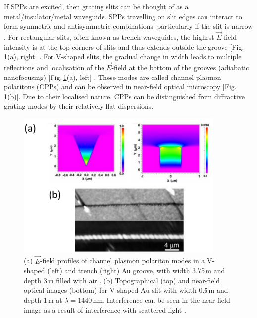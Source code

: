 If SPPs are excited, then grating slits can be thought of as a metal/insulator/metal waveguide. SPPs travelling on slit edges can interact to form symmetric and antisymmetric combinations, particularly if the slit is narrow \cite{Maier2007}. For rectangular slits, often known as trench waveguides, the highest $\vec{E}$-field intensity is at the top corners of slits and thus extends outside the groove [Fig.\,\ref{3Fig6}(a), right] \cite{Bozhevolnyi2005, Srivastava2009, Chattopadhyay2012}. For V-shaped slits, the gradual change in width leads to multiple reflections and localisation of the $\vec{E}$-field at the bottom of the grooves (adiabatic nanofocusing) [Fig.\,\ref{3Fig6}(a), left] \cite{Bozhevolnyi2005, Srivastava2009, Novikov2002, Kuttge2009, Sondergaard2012}. These modes are called channel plasmon polaritons (CPPs) and can be observed in near-field optical microscopy [Fig.\,\ref{3Fig6}(b)]. Due to their localised nature, CPPs can be distinguished from diffractive grating modes by their relatively flat dispersions.
\begin{figure}[h!] 
\centering    
\includegraphics[width=0.9\textwidth]{Fig6}
\caption{(a) $\vec{E}$-field profiles of channel plasmon polariton modes in a V-shaped (left) and trench (right) Au groove, with width 3.75\,\textmu m and depth 3\,\textmu m filled with air \cite{Srivastava2009}. (b) Topographical (top) and near-field optical images (bottom) for V-shaped Au slit with width 0.6\,\textmu m and depth 1\,\textmu m at $\lambda=1440$\,nm. Interference can be seen in the near-field image as a result of interference with scattered light \cite{Bozhevolnyi2005}.}
\label{3Fig6}
\end{figure} 

